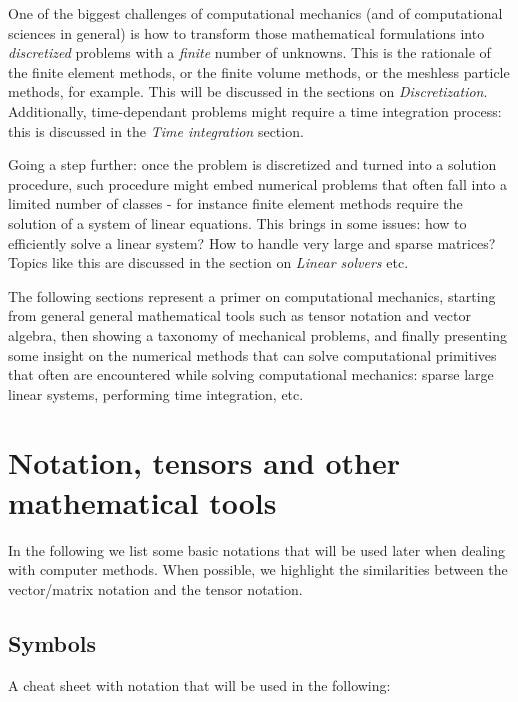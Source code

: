 \documentclass{digitaldynamics}
\begin{document}
One of the biggest challenges of computational mechanics (and of computational sciences in general) is how to transform those mathematical formulations into \textit{discretized} problems with a \textit{finite} number of unknowns. This is the rationale of the finite element methods, or the finite volume methods, or the meshless particle methods, for example. This will be discussed in the sections on \textit{Discretization}. Additionally, time-dependant problems might require a time integration process: this is discussed in the \textit{Time integration} section.

Going a step further: once the problem is discretized and turned into a solution procedure, such procedure might embed numerical problems that often fall into a limited number of classes - for instance finite element methods require the solution of a system of linear equations. This brings in some issues: how to efficiently solve a linear system? How to handle very large and sparse matrices? Topics like this are discussed in the section on \textit{Linear solvers} etc.

The following sections represent a primer on computational mechanics, starting from general general mathematical tools such as tensor notation and vector algebra, then showing a taxonomy of mechanical problems, and finally presenting some insight on the numerical methods that can solve computational primitives that often are encountered while solving computational mechanics: sparse large linear systems, performing time integration, etc.


\newpage
\section{Notation, tensors and other mathematical tools}

In the following we list some basic notations that will be used later when dealing with computer methods. 
When possible, we highlight the similarities between the vector/matrix notation and the tensor notation.


\subsection{Symbols}

A cheat sheet with notation that will be used in the following:
\end{document}
